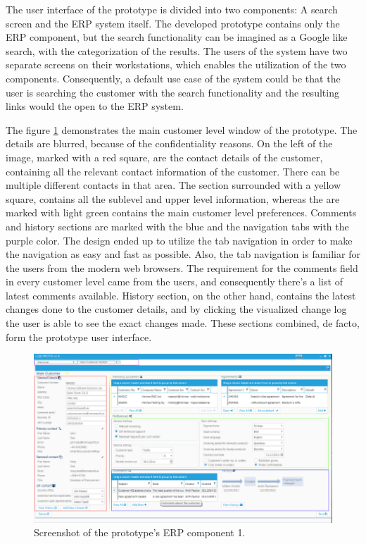 \documentclass[12pt,a4paper,oneside,pdftex]{report}
\begin{document}
The user interface of the prototype is divided into two components: A search screen and the ERP system itself. The developed prototype contains only the ERP component, but the search functionality can be imagined as a Google like search, with the categorization of the results. The users of the system have two separate screens on their workstations, which enables the utilization of the two components. Consequently, a default use case of the system could be that the user is searching the customer with the search functionality and the resulting links would the open to the ERP system. 

The figure \ref{fig:protooneimg} demonstrates the main customer level window of the prototype. The details are blurred, because of the confidentiality reasons. On the left of the image, marked with a red square, are the contact details of the customer, containing all the relevant contact information of the customer. There can be multiple different contacts in that area. The section surrounded with a yellow square, contains all the sublevel and upper level information, whereas the are marked with light green contains the main customer level preferences. Comments and history sections are marked with the blue and the navigation tabs with the purple color. The design ended up to utilize the tab navigation in order to make the navigation as easy and fast as possible. Also, the tab navigation is familiar for the users from the modern web browsers. The requirement for the comments field in every customer level came from the users, and consequently there's a list of latest comments available. History section, on the other hand, contains the latest changes done to the customer details, and by clicking the visualized change log the user is able to see the exact changes made. These sections combined, de facto, form the prototype user interface.

\begin{figure}[H]

  	\centerline{
    	   \includegraphics[width=1.4\textwidth]{./images/proto_main.png}
    	   }
  	   \caption{Screenshot of the prototype's ERP component 1.}
	   \label{fig:protooneimg}
\end{figure}
\end{document}

